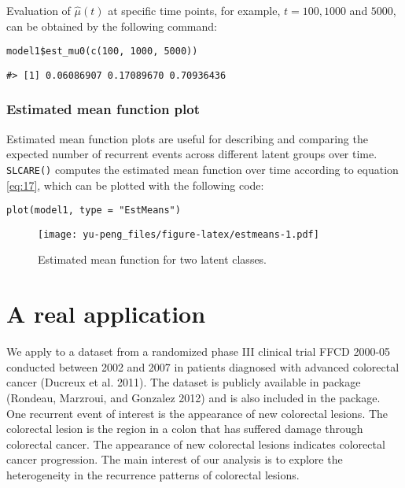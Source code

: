 Evaluation of \(\hat{\mu}(t)\) at specific time points, for example, \(t=100, 1000\) and \(5000\),
can be obtained by the following command:

\begin{verbatim}
model1$est_mu0(c(100, 1000, 5000))
\end{verbatim}

\begin{verbatim}
#> [1] 0.06086907 0.17089670 0.70936436
\end{verbatim}

\hypertarget{estimated-mean-function-plot}{%
\subsubsection{Estimated mean function plot}\label{estimated-mean-function-plot}}

Estimated mean function plots are useful for describing and comparing the expected number of recurrent events across different latent groups over time. \texttt{SLCARE()} computes the estimated mean function over time according to equation \eqref{eq:17}, which can be plotted with the following code:

\begin{verbatim}
plot(model1, type = "EstMeans")
\end{verbatim}

\begin{figure}
\centering
\texttt{[image: yu-peng\_files/figure-latex/estmeans-1.pdf]}
\caption{\label{fig:estmeans}Estimated mean function for two latent classes.}
\end{figure}

\hypertarget{a-real-application}{%
\section{A real application}\label{a-real-application}}

We apply  to a dataset from a randomized phase III clinical trial FFCD 2000-05 conducted between 2002 and 2007 in patients diagnosed with advanced colorectal cancer
(Ducreux et al. 2011). The dataset is publicly available in  package (Rondeau, Marzroui, and Gonzalez 2012) and is also included in the  package. One recurrent event of interest is the appearance of new colorectal lesions. The colorectal lesion is the region in a colon that has suffered damage through colorectal cancer. The appearance of new colorectal lesions indicates colorectal cancer progression. The main interest of our analysis is to explore the heterogeneity in the recurrence patterns of colorectal lesions.

